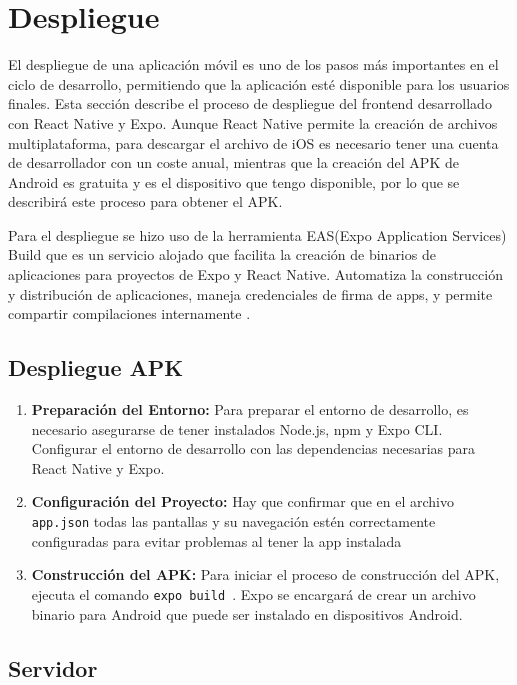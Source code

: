 \chapter{Despliegue}

El despliegue de una aplicación móvil es uno de los pasos más importantes en el ciclo de desarrollo, permitiendo que la aplicación esté disponible para los usuarios finales. Esta sección describe el proceso de despliegue del frontend desarrollado con React Native y Expo. Aunque React Native permite la creación de archivos multiplataforma, para descargar el archivo de iOS es necesario tener una cuenta de desarrollador con un coste anual, mientras que la creación del APK de Android es gratuita y es el dispositivo que tengo disponible, por lo que se describirá este proceso para obtener el APK.

Para el despliegue se hizo uso de la herramienta EAS(Expo Application Services) Build que es un servicio alojado que facilita la creación de binarios de aplicaciones para proyectos de Expo y React Native. Automatiza la construcción y distribución de aplicaciones, maneja credenciales de firma de apps, y permite compartir compilaciones internamente \cite{easbuild}. 

\section{Despliegue APK}

\begin{enumerate}
    \item \textbf{Preparación del Entorno: } Para preparar el entorno de desarrollo, es necesario asegurarse de tener instalados Node.js, npm y Expo CLI. Configurar el entorno de desarrollo con las dependencias necesarias para React Native y Expo.
    \item \textbf{Configuración del Proyecto: } Hay que confirmar que en el archivo \texttt{app.json} todas las pantallas y su navegación estén correctamente configuradas para evitar problemas al tener la app instalada
    \item \textbf{Construcción del APK: } Para iniciar el proceso de construcción del APK, ejecuta el comando \texttt{expo build
          }. Expo se encargará de crear un archivo binario para Android que puede ser instalado en dispositivos Android.

\end{enumerate}

\section{Servidor}

